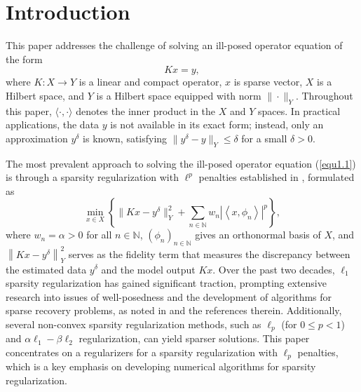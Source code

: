 \documentclass[a4paper,12pt]{article}
\numberwithin{equation}{section}
\begin{document}

\section{Introduction}

\par This paper addresses the challenge of solving an ill-posed operator equation of the form 
\begin{equation}\label{equ1.1}
Kx=y,
\end{equation}
where $K:X\rightarrow Y$ is a linear and compact operator, $x$ is sparse vector, $X$ is a Hilbert space, and $Y$ is a Hilbert space equipped with norm $\|\cdot\|_Y$. Throughout this paper, $\langle \cdot,\cdot\rangle$ denotes the inner product in the $X$ and $Y$ spaces. In practical applications, the data $y$ is not available in its exact form; instead, only an approximation $y^{\delta}$ is known, satisfying $\|y^{\delta}-y\|_Y\leq \delta$ for a small $\delta>0$. 

\par The most prevalent approach to solving the ill-posed operator equation (\ref{equ1.1}) is through a sparsity regularization with $\ell^{p}$ penalties established in \cite{DDD04}, formulated as
\begin{equation}\label{equ1.2}
    \min\limits_{x\in X}\left\{\|Kx-y^{\delta}\|_Y^{2}+\sum_{n\in\mathbb{N}} w_{n}\left|\left<x,\phi_{n}\right>\right|^{p}\right\},
\end{equation}
where $w_{n}=\alpha>0$ for all $n\in\mathbb{N}$, $\left(\phi_{n}\right)_{n\in\mathbb{N}}$ gives an orthonormal basis of $X$, and $\left\|Kx-y^{\delta}\right\|_Y^{2}$ serves as the fidelity term that measures the discrepancy between the estimated data $y^{\delta}$ and the model output $Kx$. Over the past two decades, $\ell_1$ sparsity regularization has gained significant traction, prompting extensive research into issues of well-posedness and the development of algorithms for sparse recovery problems, as noted in \cite{DDD04,F2010,JM12} and the references therein. Additionally, several non-convex sparsity regularization methods, such as $\ell_p$ (for $0\le p<1$) \cite{BL09,G10} and $\alpha\ell_1-\beta\ell_2$ \cite{DH19,DH20} regularization, can yield sparser solutions. This paper concentrates on a regularizers for a sparsity regularization with $\ell_{p}$ penalties, which is a key emphasis on developing numerical algorithms for sparsity regularization.
\end{document}
